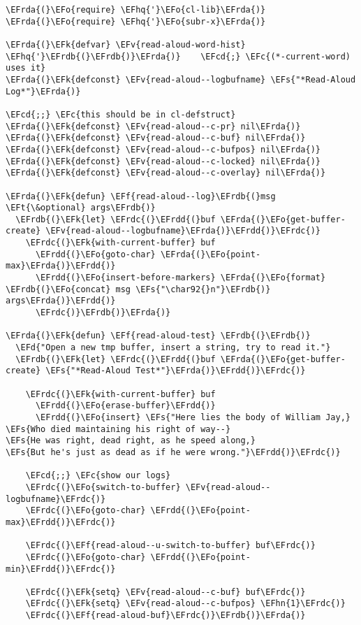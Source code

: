 \documentclass[a4wide,10pt]{article}
\newcommand{\EFc}[1]{\textcolor{EFc}{#1}} %
\newcommand{\EFcd}[1]{\textcolor{EFcd}{#1}} %
\newcommand{\EFs}[1]{\textcolor{EFs}{#1}} %
\newcommand{\EFd}[1]{\textcolor{EFd}{#1}} %
\newcommand{\EFk}[1]{\textcolor{EFk}{#1}} %
\newcommand{\EFf}[1]{\textcolor{EFf}{#1}} %
\newcommand{\EFv}[1]{\textcolor{EFv}{#1}} %
\newcommand{\EFt}[1]{\textcolor{EFt}{#1}} %
\newcommand{\EFo}[1]{\textcolor{EFo}{#1}} %
\newcommand{\EFhn}[1]{\textcolor{EFhn}{\textbf{#1}}} %
\newcommand{\EFhq}[1]{\textcolor{EFhq}{#1}} %
\newcommand{\EFrda}[1]{\textcolor{EFrda}{#1}} %
\newcommand{\EFrdb}[1]{\textcolor{EFrdb}{#1}} %
\newcommand{\EFrdc}[1]{\textcolor{EFrdc}{#1}} %
\newcommand{\EFrdd}[1]{\textcolor{EFrdd}{#1}} %
\begin{document}
\begin{Code}
\begin{Verbatim}
\EFrda{(}\EFo{require} \EFhq{'}\EFo{cl-lib}\EFrda{)}
\EFrda{(}\EFo{require} \EFhq{'}\EFo{subr-x}\EFrda{)}

\EFrda{(}\EFk{defvar} \EFv{read-aloud-word-hist} \EFhq{'}\EFrdb{(}\EFrdb{)}\EFrda{)}	\EFcd{;} \EFc{(*-current-word) uses it}
\EFrda{(}\EFk{defconst} \EFv{read-aloud--logbufname} \EFs{"*Read-Aloud Log*"}\EFrda{)}

\EFcd{;;} \EFc{this should be in cl-defstruct}
\EFrda{(}\EFk{defconst} \EFv{read-aloud--c-pr} nil\EFrda{)}
\EFrda{(}\EFk{defconst} \EFv{read-aloud--c-buf} nil\EFrda{)}
\EFrda{(}\EFk{defconst} \EFv{read-aloud--c-bufpos} nil\EFrda{)}
\EFrda{(}\EFk{defconst} \EFv{read-aloud--c-locked} nil\EFrda{)}
\EFrda{(}\EFk{defconst} \EFv{read-aloud--c-overlay} nil\EFrda{)}

\EFrda{(}\EFk{defun} \EFf{read-aloud--log}\EFrdb{(}msg \EFt{\&optional} args\EFrdb{)}
  \EFrdb{(}\EFk{let} \EFrdc{(}\EFrdd{(}buf \EFrda{(}\EFo{get-buffer-create} \EFv{read-aloud--logbufname}\EFrda{)}\EFrdd{)}\EFrdc{)}
    \EFrdc{(}\EFk{with-current-buffer} buf
      \EFrdd{(}\EFo{goto-char} \EFrda{(}\EFo{point-max}\EFrda{)}\EFrdd{)}
      \EFrdd{(}\EFo{insert-before-markers} \EFrda{(}\EFo{format} \EFrdb{(}\EFo{concat} msg \EFs{"\char92{}n"}\EFrdb{)} args\EFrda{)}\EFrdd{)}
      \EFrdc{)}\EFrdb{)}\EFrda{)}

\EFrda{(}\EFk{defun} \EFf{read-aloud-test} \EFrdb{(}\EFrdb{)}
  \EFd{"Open a new tmp buffer, insert a string, try to read it."}
  \EFrdb{(}\EFk{let} \EFrdc{(}\EFrdd{(}buf \EFrda{(}\EFo{get-buffer-create} \EFs{"*Read-Aloud Test*"}\EFrda{)}\EFrdd{)}\EFrdc{)}

    \EFrdc{(}\EFk{with-current-buffer} buf
      \EFrdd{(}\EFo{erase-buffer}\EFrdd{)}
      \EFrdd{(}\EFo{insert} \EFs{"Here lies the body of William Jay,}
\EFs{Who died maintaining his right of way--}
\EFs{He was right, dead right, as he speed along,}
\EFs{But he's just as dead as if he were wrong."}\EFrdd{)}\EFrdc{)}

    \EFcd{;;} \EFc{show our logs}
    \EFrdc{(}\EFo{switch-to-buffer} \EFv{read-aloud--logbufname}\EFrdc{)}
    \EFrdc{(}\EFo{goto-char} \EFrdd{(}\EFo{point-max}\EFrdd{)}\EFrdc{)}

    \EFrdc{(}\EFf{read-aloud--u-switch-to-buffer} buf\EFrdc{)}
    \EFrdc{(}\EFo{goto-char} \EFrdd{(}\EFo{point-min}\EFrdd{)}\EFrdc{)}

    \EFrdc{(}\EFk{setq} \EFv{read-aloud--c-buf} buf\EFrdc{)}
    \EFrdc{(}\EFk{setq} \EFv{read-aloud--c-bufpos} \EFhn{1}\EFrdc{)}
    \EFrdc{(}\EFf{read-aloud-buf}\EFrdc{)}\EFrdb{)}\EFrda{)}


\end{Verbatim}
\end{Code}
\end{document}
